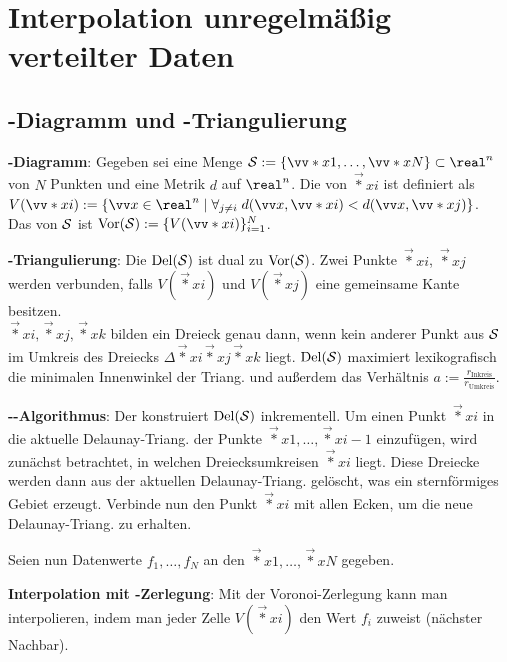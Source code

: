\section{%
    Interpolation unregelmäßig verteilter Daten%
}

\subsection{%
    -Diagramm und -Triangulierung%
}

\textbf{-Diagramm}:
Gegeben sei eine Menge $\S := \{\vec*{x}{1}, \dotsc, \vec*{x}{N}\} \subset \real^n$ von
$N$ Punkten und eine Metrik $d$ auf $\real^n$.
Die  von $\vec*{x}{i}$ ist definiert als\\
$V(\vec*{x}{i}) := \{\vec{x} \in \real^n \;|\;
\forall_{j\not=i}\; d(\vec{x}, \vec*{x}{i}) < d(\vec{x}, \vec*{x}{j})\}$.\\
Das  von $\S$ ist $\Vor(\S) := \{V(\vec*{x}{i})\}_{i=1}^N$.

\textbf{-Triangulierung}:
Die  $\Del(\S)$ ist dual zu $\Vor(\S)$.
Zwei Punkte $\vec*{x}{i}$, $\vec*{x}{j}$ werden verbunden, falls
$V(\vec*{x}{i})$ und $V(\vec*{x}{j})$ eine gemeinsame Kante besitzen.\\
$\vec*{x}{i}, \vec*{x}{j}, \vec*{x}{k}$ bilden ein Dreieck genau dann, wenn
kein anderer Punkt aus $\S$ im Umkreis des Dreiecks
$\Delta\vec*{x}{i}\vec*{x}{j}\vec*{x}{k}$ liegt.
$\Del(\S)$ maximiert lexikografisch die minimalen Innenwinkel der Triang. und außerdem
das Verhältnis $a := \frac{r_\text{Inkreis}}{r_\text{Umkreis}}$.

\textbf{--Algorithmus}:
Der  konstruiert $\Del(\S)$ inkrementell.
Um einen Punkt $\vec*{x}{i}$ in die aktuelle Delaunay-Triang. der Punkte
$\vec*{x}{1}, \dotsc, \vec*{x}{i-1}$ einzufügen,
wird zunächst betrachtet, in welchen Dreiecksumkreisen $\vec*{x}{i}$ liegt.
Diese Dreiecke werden dann aus der aktuellen Delaunay-Triang. gelöscht,
was ein sternförmiges Gebiet erzeugt.
Verbinde nun den Punkt $\vec*{x}{i}$ mit allen Ecken, um die neue Delaunay-Triang. zu erhalten.

\linie

Seien nun Datenwerte $f_1, \dotsc, f_N$ an den $\vec*{x}{1}, \dotsc, \vec*{x}{N}$ gegeben.

\textbf{Interpolation mit -Zerlegung}:
Mit der Voronoi-Zerlegung kann man interpolieren,
indem man jeder Zelle $V(\vec*{x}{i})$ den Wert $f_i$ zuweist
(nächster Nachbar).

